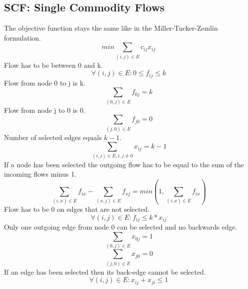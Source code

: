 \documentclass{article}
\begin{document}
\subsection{SCF: Single Commodity Flows \label{scf}}
The objective function stays the same like in the Miller-Tucker-Zemlin formulation.
\setcounter{equation}{0}
\begin{equation}
min \sum_{(i,j) \in E} c_{ij} x_{ij}
\end{equation}
Flow has to be between 0 and k.
\begin{equation}
\forall (i,j) \in E : 0 \le f_{ij} \le k 
\end{equation}
Flow from node 0 to j is k.
\begin{equation}
\sum_{(0,j) \in E} f_{0j} = k
\end{equation}
Flow from node j to 0 is 0.
\begin{equation}
\sum_{(j,0) \in E} f_{j0} = 0
\end{equation}
Number of selected edges equals $k-1$.
\begin{equation}
\sum_{(i,j) \in E, i,j \not= 0} x_{ij} = k - 1
\end{equation}
If a node has been selected the outgoing flow has to be equal to the sum of the incoming flows minus 1. 
\begin{equation}
\sum_{(i,x) \in E} f_{ix} - \sum_{(x,j) \in E} f_{xj} = min(1, \sum_{(i,x) \in E} f_{ix})
\end{equation}
Flow has to be 0 on edges that are not selected.
\begin{equation}
\forall (i,j) \in E : f_{ij} \le k*x_{ij}
\end{equation}
Only one outgoing edge from node 0 can be selected and no backwards edge.
\begin{equation}
\sum_{(0,j) \in E} x_{0j} = 1
\end{equation}
\begin{equation}
\sum_{(j,0) \in E} x_{j0} = 0
\end{equation}
If an edge has been selected then its back-edge cannot be selected.
\begin{equation}
\forall (i,j) \in E: x_{ij} + x_{ji} \le 1
\end{equation}
\end{document}
